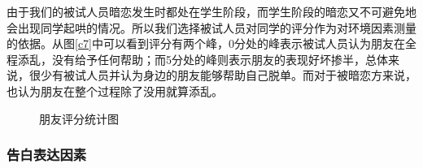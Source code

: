 \documentclass[10pt, a4paper, twocolumn]{ctexart}
\begin{document}
由于我们的被试人员暗恋发生时都处在学生阶段，而学生阶段的暗恋又不可避免地会出现同学起哄的情况。所以我们选择被试人员对同学的评分作为对环境因素测量的依据。从图\ref{c7}中可以看到评分有两个峰，0分处的峰表示被试人员认为朋友在全程添乱，没有给予任何帮助；而5分处的峰则表示朋友的表现好坏掺半，总体来说，很少有被试人员并认为身边的朋友能够帮助自己脱单。而对于被暗恋方来说，也认为朋友在整个过程除了没用就算添乱。\\
\begin{figure}[htbp]
	\quad
	\caption{朋友评分统计图} %
\end{figure}
\subsubsection{告白表达因素}
\end{document}
